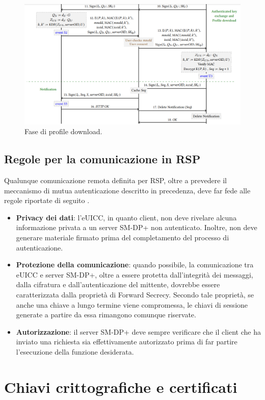 \documentclass[10pt, twoside, openany]{book}
\begin{document}
\begin{figure}
\includegraphics[width=\linewidth]{profile-download.png}
\caption{Fase di profile download.}
\label{fig:profile-download}
\end{figure}

\subsection{Regole per la comunicazione in RSP}
Qualunque comunicazione remota definita per RSP, oltre a prevedere il meccanismo di mutua autenticazione descritto in precedenza, deve far fede alle regole riportate di seguito \cite{GSMA-docs}.
\begin{itemize}
\item \textbf{Privacy dei dati}: l'eUICC, in quanto client, non deve rivelare alcuna informazione privata a un server SM-DP+ non autenticato. Inoltre, non deve generare materiale firmato prima del completamento del processo di autenticazione.
\item \textbf{Protezione della comunicazione}: quando possibile, la comunicazione tra eUICC e server SM-DP+, oltre a essere protetta dall'integrità dei messaggi, dalla cifratura e dall'autenticazione del mittente, dovrebbe essere caratterizzata dalla proprietà di Forward Secrecy. Secondo tale proprietà, se anche una chiave a lungo termine viene compromessa, le chiavi di sessione generate a partire da essa rimangono comunque riservate.
\item \textbf{Autorizzazione}: il server SM-DP+ deve sempre verificare che il client che ha inviato una richiesta sia effettivamente autorizzato prima di far partire l'esecuzione della funzione desiderata.
\end{itemize}

\section{Chiavi crittografiche e certificati}
\end{document}
